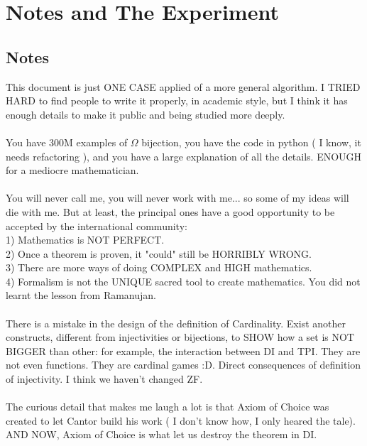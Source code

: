 \chapter{Notes and The Experiment}

	\section{Notes}
	
		\noindent
		This document is just ONE CASE applied of a more general algorithm. I TRIED HARD to find people to write it properly, in academic style, but I think it has enough details to make it public and being studied more deeply.
		\\\\
		
		\noindent
		You have 300M examples of $\Omega$ bijection, you have the code in python ( I know, it needs refactoring ), and you have a large explanation of all the details. ENOUGH for a mediocre mathematician.
		\\\\
		
		\noindent
		You will never call me, you will never work with me... so some of my ideas will die with me. But at least, the principal ones have a good opportunity to be accepted by the international community:\\
		1) Mathematics is NOT PERFECT.\\
		2) Once a theorem is proven, it "could" still be HORRIBLY WRONG.\\
		3) There are more ways of doing COMPLEX and HIGH mathematics.\\
		4) Formalism is not the UNIQUE sacred tool to create mathematics. You did not learnt the lesson from Ramanujan.
		\\\\
		
		\noindent
		There is a mistake in the design of the definition of Cardinality. Exist another constructs, different from injectivities or bijections, to SHOW how a set is NOT BIGGER than other: for example, the interaction between DI and TPI. They are not even functions. They are cardinal games :D. Direct consequences of definition of injectivity. I think we haven't changed ZF.
		\\\\
		
		\noindent
		The curious detail that makes me laugh a lot is that Axiom of Choice was created to let Cantor build his work ( I don't know how, I only heared the tale). AND NOW, Axiom of Choice is what let us destroy the theorem in DI.
		\\\\
		
